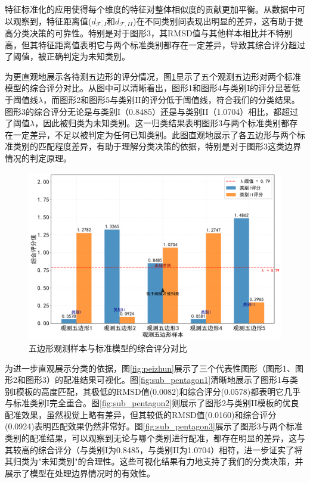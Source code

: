 特征标准化的应用使得每个维度的特征对整体相似度的贡献更加平衡。从数据中可以观察到，特征距离值($d_{\mathcal{F},I}$和$d_{\mathcal{F},II}$)在不同类别间表现出明显的差异，这有助于提高分类决策的可靠性。特别是对于图形3，其RMSD值与其他样本相比并不特别高，但其特征距离值表明它与两个标准类别都存在一定差异，导致其综合评分超过了阈值，被正确判定为未知类别。

为更直观地展示各待测五边形的评分情况，图\ref{fig:pentagon_classification_scores}显示了五个观测五边形对两个标准模型的综合评分对比。从图中可以清晰看出，图形1和图形4与类别I的评分显著低于阈值线$\lambda$，而图形2和图形5与类别II的评分低于阈值线，符合我们的分类结果。图形3的综合评分无论是与类别I（0.8485）还是与类别II（1.0704）相比，都超过了阈值$\lambda$，因此被归类为未知类别。这一归类结果表明图形3与两个标准类别都存在一定差异，不足以被判定为任何已知类别。此图直观地展示了各五边形与两个标准类别的匹配程度差异，有助于理解分类决策的依据，特别是对于图形3这类边界情况的判定原理。

\begin{figure}[H]
    \centering
    \includegraphics[width=1.0\textwidth]{figures/analysis/pentagon_classification_scores.png}
    \caption{五边形观测样本与标准模型的综合评分对比}
    \label{fig:pentagon_classification_scores}
\end{figure}


为进一步直观展示分类的依据，图\ref{fig:peizhun}展示了三个代表性图形（图形1、图形2和图形3）的配准结果可视化。图\ref{fig:sub_pentagon1}清晰地展示了图形1与类别I模板的高度匹配，其极低的RMSD值(0.0082)和综合评分(0.0578)都表明它几乎与标准类别I完全重合。图\ref{fig:sub_pentagon2}则展示了图形2与类别II模板的优良配准效果，虽然视觉上略有差异，但其较低的RMSD值(0.0160)和综合评分(0.0924)表明匹配效果仍然非常好。图\ref{fig:sub_pentagon3}展示了图形3与两个标准类别的配准结果，可以观察到无论与哪个类别进行配准，都存在明显的差异，这与其较高的综合评分（与类别I为0.8485，与类别II为1.0704）相符，进一步证实了将其归类为"未知类别"的合理性。这些可视化结果有力地支持了我们的分类决策，并展示了模型在处理边界情况时的有效性。

